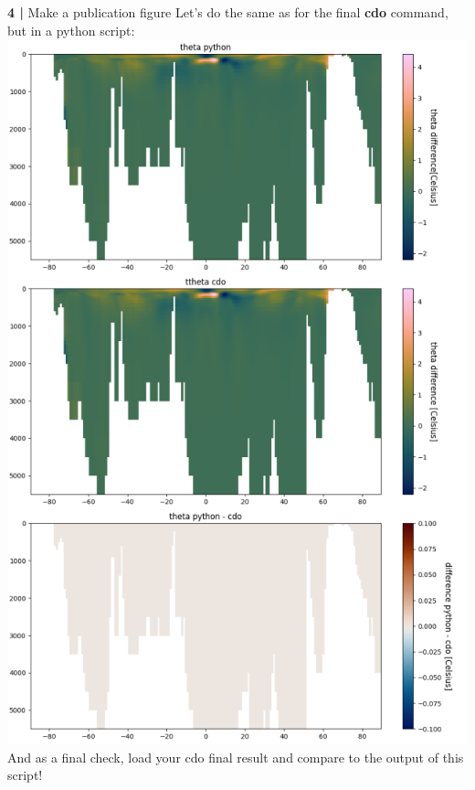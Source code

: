 \begin{frame}{\textbf{4 |} Make a publication figure} 
    Let's do the same as for the final \textbf{cdo} command, but in a python script:\\
        \vspace{0.5cm}
    \includegraphics[scale=0.20]{images/difference_cdo_python.png}\\
    And as a final check, load your cdo final result and compare to the output of this script!
\end{frame}

